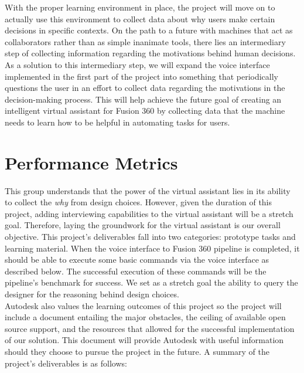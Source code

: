 \documentclass[10pt, draftclsnofoot, onecolumn]{IEEEtran}
\begin{document}
With the proper learning environment in place, the project will move on to actually use this environment to collect data about why users make certain decisions in specific contexts. On the path to a future with machines that act as collaborators rather than as simple inanimate tools, there lies an intermediary step of collecting information regarding the motivations behind human decisions. As a solution to this intermediary step, we will expand the voice interface implemented in the first part of the project into something that periodically questions the user in an effort to collect data regarding the motivations in the decision-making process. This will help achieve the future goal of creating an intelligent virtual assistant for Fusion 360 by collecting data that the machine needs to learn how to be helpful in automating tasks for users. \\

\section*{Performance Metrics}
This group understands that the power of the virtual assistant lies in its ability to collect the \textit{why} from design choices. However, given the duration of this project, adding interviewing capabilities to the virtual assistant will be a stretch goal. Therefore, laying the groundwork for the virtual assistant is our overall objective. This project’s deliverables fall into two categories: prototype tasks and learning material. When the voice interface to Fusion 360 pipeline is completed, it should be able to execute some basic commands via the voice interface as described below. The successful execution of these commands will be the pipeline’s benchmark for success. 
We set as a stretch goal the ability to query the designer for the reasoning behind design choices. \\

Autodesk also values the learning outcomes of this project so the project will include a document entailing the major obstacles, the ceiling of available open source support, and the resources that allowed for the successful implementation of our solution. This document will provide Autodesk with useful information should they choose to pursue the project in the future. A summary of the project's deliverables is as follows: \\
\end{document}
